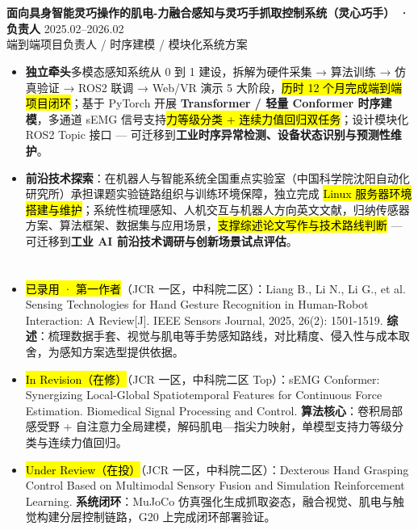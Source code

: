 \section[科研与项目经历]{}
{\small\textbf{面向具身智能灵巧操作的肌电-力融合感知与灵巧手抓取控制系统（灵心巧手） · 负责人}} \hfill {2025.02--2026.02} \\
{\scriptsize\color{WHU_Blue} 端到端项目负责人 / 时序建模 / 模块化系统方案}
\begin{itemize}
    \item \textbf{独立牵头}多模态感知系统从 0 到 1 建设，拆解为硬件采集 → 算法训练 → 仿真验证 → ROS2 联调 → Web/VR 演示 5 大阶段，\hl{历时 12 个月完成端到端项目闭环}；基于 PyTorch 开展 \textbf{Transformer / 轻量 Conformer 时序建模}，多通道 sEMG 信号支持\hl{力等级分类 + 连续力值回归双任务}；设计模块化 ROS2 Topic 接口 — 可迁移到\textbf{工业时序异常检测、设备状态识别与预测性维护}。
    \item \textbf{前沿技术探索}：在机器人与智能系统全国重点实验室（中国科学院沈阳自动化研究所）承担课题实验链路组织与训练环境保障，独立完成 \hl{Linux 服务器环境搭建与维护}；系统性梳理感知、人机交互与机器人方向英文文献，归纳传感器方案、算法框架、数据集与应用场景，\hl{支撑综述论文写作与技术路线判断} — 可迁移到\textbf{工业 AI 前沿技术调研与创新场景试点评估}。
\end{itemize}

\section[论文与研究成果]{}
\begin{itemize}
    \item \hl{已录用 · 第一作者}（JCR 一区，中科院二区）：Liang B., Li N., Li G., et al. Sensing Technologies for Hand Gesture Recognition in Human-Robot Interaction: A Review[J]. IEEE Sensors Journal, 2025, 26(2): 1501-1519. \textbf{综述}：梳理数据手套、视觉与肌电等手势感知路线，对比精度、侵入性与成本取舍，为感知方案选型提供依据。
    \item \hl{In Revision（在修）}（JCR 一区，中科院二区 Top）：sEMG Conformer: Synergizing Local-Global Spatiotemporal Features for Continuous Force Estimation. Biomedical Signal Processing and Control. \textbf{算法核心}：卷积局部感受野 + 自注意力全局建模，解码肌电—指尖力映射，单模型支持力等级分类与连续力值回归。
    \item \hl{Under Review（在投）}（JCR 一区，中科院二区）：Dexterous Hand Grasping Control Based on Multimodal Sensory Fusion and Simulation Reinforcement Learning. \textbf{系统闭环}：MuJoCo 仿真强化生成抓取姿态，融合视觉、肌电与触觉构建分层控制链路，G20 上完成闭环部署验证。
\end{itemize}


